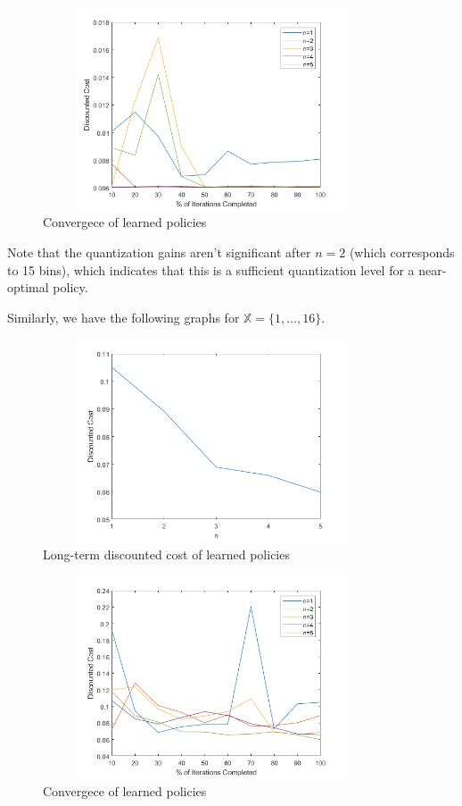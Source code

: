 \documentclass{article}
\begin{document}
\begin{figure}[H]
    \centering
    \includegraphics[height=6cm, width=10cm]{Quantization_5.png}
    \caption{Convergece of learned policies}
\end{figure}

Note that the quantization gains aren't significant after \( n=2 \) (which corresponds to 15 bins), which indicates that this is a sufficient quantization level for a near-optimal policy.

Similarly, we have the following graphs for \( \mathbb{X} = \{1,\ldots,16\} \).

\begin{figure}[H]
    \centering
    \includegraphics[height=6cm, width=10cm]{Cost_16.png}
    \caption{Long-term discounted cost of learned policies}
\end{figure}

\begin{figure}[H]
    \centering
    \includegraphics[height=6cm, width=10cm]{Quantization_16.png}
    \caption{Convergece of learned policies}
\end{figure}
\end{document}
